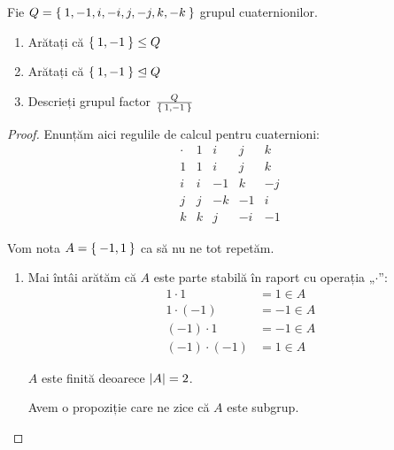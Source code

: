 \begin{exercise}
Fie \(Q = \Set{ 1, -1, i, -i, j, -j, k, -k }\) grupul cuaternionilor.
\begin{enumerate}
    \item Arătați că \(\Set{ 1, -1 } \leq Q\)
    \item Arătați că \(\Set{ 1, -1 } \trianglelefteq Q\)
    \item Descrieți grupul factor \(\frac{Q}{\Set{ 1, -1 }}\)
\end{enumerate}
\end{exercise}
\begin{proof}
Enunțăm aici regulile de calcul pentru cuaternioni:
\[
\begin{array}{c|c|c|c|c}
    \cdot & 1 & i & j & k \\
    \hline
    1 & 1 & i & j & k \\
    \hline
    i & i & -1 & k & -j \\
    \hline
    j & j & -k & -1 & i \\
    \hline
    k & k & j & -i & -1
\end{array}
\]

Vom nota \(A = \Set{ -1, 1 }\) ca să nu ne tot repetăm.
\begin{enumerate}
    \item Mai întâi arătăm că \(A\) este parte stabilă în raport cu operația „\(\cdot\)”:
    \begin{align*}
        1 \cdot 1 &= 1 \in A \\
        1 \cdot (-1) &= -1 \in A \\
        (-1) \cdot 1 &= -1 \in A \\
        (-1) \cdot (-1) &= 1 \in A
    \end{align*}
    
    \(A\) este finită deoarece \(\left\lvert A \right\rvert = 2\).
    
    Avem o propoziție care ne zice că \(A\) este subgrup.
    

\end{enumerate}
\end{proof}
